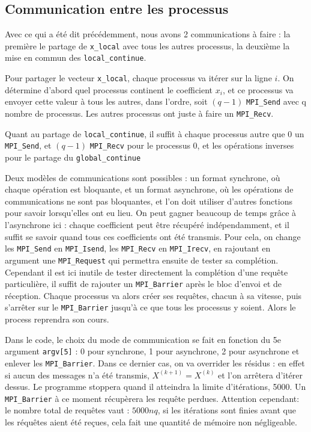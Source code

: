 \documentclass[11pt, a4paper]{article}
\begin{document}
\newpage
\subsection{Communication entre les processus}

Avec ce qui a été dit précédemment, nous avons 2 communications à faire :
la première le partage de \lstinline{x_local} avec tous les autres processus,
la deuxième la mise en commun des \lstinline{local_continue}.

\bigskip

Pour partager le vecteur \lstinline{x_local}, chaque processus va itérer sur la ligne \(i\).
On détermine d'abord quel processus continent le coefficient \(x_i\),
et ce processus va envoyer cette valeur à tous les autres, dans l'ordre,
soit \((q-1)\) \lstinline{MPI_Send} avec q nombre de processus.
Les autres processus ont juste à faire un \lstinline{MPI_Recv}.

Quant au partage de \lstinline{local_continue},
il suffit à chaque processus autre que 0 un \lstinline{MPI_Send}, et
\((q-1)\) \lstinline{MPI_Recv} pour le processus 0, et les opérations inverses
pour le partage du \lstinline{global_continue}

\bigskip

Deux modèles de communications sont possibles : un format synchrone,
où chaque opération est bloquante, et un format asynchrone, où les opérations
de communications ne sont pas bloquantes, et l'on doit utiliser d'autres fonctions
pour savoir lorsqu'elles ont eu lieu.
On peut gagner beaucoup de temps grâce à l'asynchrone ici :
chaque coefficient peut être récupéré indépendamment, et il suffit se savoir
quand tous ces coefficients ont été transmis.
Pour cela, on change les \lstinline{MPI_Send} en \lstinline{MPI_Isend},
les \lstinline{MPI_Recv} en \lstinline{MPI_Irecv}, en rajoutant en argument
une \lstinline{MPI_Request} qui permettra ensuite de tester sa complétion.
Cependant il est ici inutile de tester directement la complétion d'une requête particulière,
il suffit de rajouter un \lstinline{MPI_Barrier} après le bloc d'envoi et de réception.
Chaque processus va alors créer ses requêtes, chacun à sa vitesse, puis s'arrêter sur le \lstinline{MPI_Barrier} jusqu'à ce que tous les processus y soient.
Alors le process reprendra son cours.

Dans le code, le choix du mode de communication se fait en fonction du 5e argument \lstinline{argv[5]} : 0 pour synchrone, 1 pour asynchrone, 2 pour asynchrone et enlever les \lstinline{MPI_Barrier}.
Dans ce dernier cas, on va overrider les résidus : en effet si aucun des messages n'a été transmis, \(X^{(k+1)} = X^{(k)} \) et l'on arrêtera d'itérer dessus.
Le programme stoppera quand il atteindra la limite d'itérations, 5000.
Un \lstinline{MPI_Barrier} à ce moment récupèrera les requête perdues.
Attention cependant: le nombre total de requêtes vaut : \( 5000nq \), si les itérations sont finies avant que les réquêtes aient été reçues, cela fait une quantité de mémoire non négligeable.
\newpage
\end{document}
